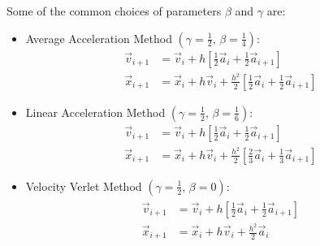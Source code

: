\documentclass[../Main.tex]{subfiles}
\begin{document}
Some of the common choices of parameters $\beta$ and $\gamma$ are:
\begin{itemize}
	\item Average Acceleration Method $\left(\gamma = \frac{1}{2} \mbox{, } \beta = \frac{1}{4}\right)$:
\begin{align*}
	\vec{v}_{i+1} & = \vec{v}_{i} + h\left[\frac{1}{2}\vec{a}_{i} + \frac{1}{2}\vec{a}_{i+1}\right]\\
	\vec{x}_{i+1} & = \vec{x}_{i} + h\vec{v}_{i} + \frac{h^2}{2}\left[\frac{1}{2}\vec{a}_{i} +\frac{1}{2}\vec{a}_{i+1}\right]
\end{align*}
	\item Linear Acceleration Method $\left(\gamma = \frac{1}{2} \mbox{, } \beta = \frac{1}{6}\right)$:
\begin{align*}
	\vec{v}_{i+1} & = \vec{v}_{i} + h\left[\frac{1}{2}\vec{a}_{i} + \frac{1}{2}\vec{a}_{i+1}\right]\\
	\vec{x}_{i+1} & = \vec{x}_{i} + h\vec{v}_{i} + \frac{h^2}{2}\left[\frac{2}{3}\vec{a}_{i} +\frac{1}{3}\vec{a}_{i+1}\right]
\end{align*}
	\item Velocity Verlet Method $\left(\gamma = \frac{1}{2} \mbox{, } \beta = 0\right)$:
\begin{align}
	\begin{split}
	\vec{v}_{i+1} & = \vec{v}_{i} + h\left[\frac{1}{2}\vec{a}_{i} + \frac{1}{2}\vec{a}_{i+1}\right] \\
	\vec{x}_{i+1} & = \vec{x}_{i} + h\vec{v}_{i} + \frac{h^2}{2}\vec{a}_{i}
	\end{split}
\end{align}
\end{itemize}
\end{document}
